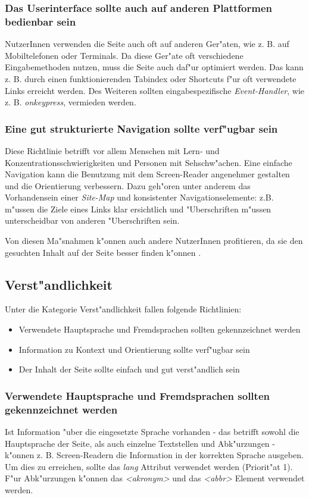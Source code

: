 \documentclass[a4paper,bibtotoc,oneside]{scrbook}
\begin{document}
\subsubsection{Das Userinterface sollte auch auf anderen Plattformen bedienbar sein}
NutzerInnen verwenden die Seite auch oft auf anderen Ger"aten, wie z. B. auf Mobiltelefonen oder Terminals. Da diese Ger"ate oft verschiedene Eingabemethoden nutzen, muss die Seite auch daf"ur optimiert werden. Das kann z. B. durch einen funktionierenden Tabindex oder Shortcuts f"ur oft verwendete Links erreicht werden. Des Weiteren sollten eingabespezifische \emph{Event-Handler}, wie z. B. \emph{onkeypress}, vermieden werden. \cite[Abschnitt 6.9]{wcag1}

\subsubsection{Eine gut strukturierte Navigation sollte verf"ugbar sein}
Diese Richtlinie betrifft vor allem Menschen mit Lern- und Konzentrationsschwierigkeiten und Personen mit Sehschw"achen. Eine einfache Navigation kann die Benutzung mit dem Screen-Reader angenehmer gestalten und die Orientierung verbessern. Dazu geh"oren unter anderem das Vorhandensein einer \emph{Site-Map} und konsistenter Navigationselemente: z.B. m"ussen die Ziele eines Links klar ersichtlich und "Uberschriften m"ussen unterscheidbar von anderen "Uberschriften sein. \cite[Abschnitt 6.13]{wcag1}

Von diesen Ma"snahmen k"onnen auch andere NutzerInnen profitieren, da sie den gesuchten Inhalt auf der Seite besser finden k"onnen \cite[S. 52]{barr_webd}.

\subsection{Verst"andlichkeit}
Unter die Kategorie Verst"andlichkeit fallen folgende Richtlinien: 

\begin{itemize}
\item Verwendete Hauptsprache und Fremdsprachen sollten gekennzeichnet werden\cite[Abschnitt 6.4]{wcag1}
\item Information zu Kontext und Orientierung sollte verf"ugbar sein\cite[Abschnitt 6.12]{wcag1}
\item Der Inhalt der Seite sollte einfach und gut verst"andlich sein\cite[Abschnitt 6.14]{wcag1}
\end{itemize}

\subsubsection{Verwendete Hauptsprache und Fremdsprachen sollten gekennzeichnet werden}
Ist Information "uber die eingesetzte Sprache vorhanden - das betrifft sowohl die Hauptsprache der Seite, als auch einzelne Textstellen und Abk"urzungen - k"onnen z. B. Screen-Readern die Information in der korrekten Sprache ausgeben. Um dies zu erreichen, sollte das \emph{lang} Attribut verwendet werden (Priorit"at 1). F"ur Abk"urzungen k"onnen das \emph{<akronym>} und das \emph{<abbr>} Element verwendet werden. \cite[Abschnitt 6.4]{wcag1}
\end{document}
